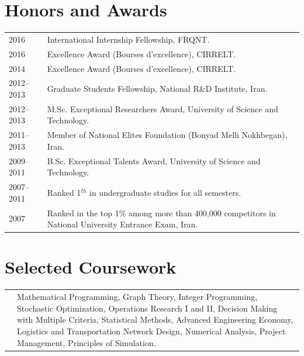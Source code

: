 \documentclass[10PT,letter]{article}
\newcommand{\numbox}[1]{} %
\begin{document}
\section*{\numbox{6}\bfseries\textcolor{titlecol}{\sffamily Honors and Awards}}

		\begin{tabular}{p{1.2in}p{5.95in}}
			\textsc{2016} & International Internship Fellowship, FRQNT. \\[1mm]
			\textsc{2016} & Excellence Award (Bourses d'excellence), CIRRELT. \\[1mm] 
			\textsc{2014} & Excellence Award (Bourses d'excellence), CIRRELT. \\[1mm] 
			\textsc{2012--2013} & Graduate Students Fellowship, National R\&D Institute,  Iran.\\[1mm]
			\textsc{2012--2013} & M.Sc. Exceptional Researchers Award, University of Science and Technology.\\[1mm]
			\textsc{2011--2013} & Member of  National Elites Foundation (Bonyad Melli Nokhbegan), Iran.\\[1mm]
			\textsc{2009--2011} & B.Sc. Exceptional Talents Award,  University of Science and Technology.\\[1mm]
			\textsc{2007--2011} & Ranked 1$^{th}$ in undergraduate studies for all semesters.\\[1mm]
				\textsc{2007} & Ranked in the top 1\% among more than 400,000 competitors in National University Entrance Exam, Iran.\\[1mm]
		\end{tabular}




    \section*{\numbox{7}\bfseries\textcolor{titlecol}{\sffamily Selected Coursework}}
			\begin{tabular}{p{0.1in}p{6.55in}}
				
				\textsc{} & 
									Mathematical Programming,   Graph Theory,  Integer Programming,  Stochastic Optimization, Operations Research I and II, Decision Making with Multiple Criteria,  Statistical Methods,  Advanced Engineering Economy,  Logistics and Transportation Network Design, Numerical Analysis, Project Management, Principles of Simulation.\\[1mm]

			\end{tabular}
\end{document}
